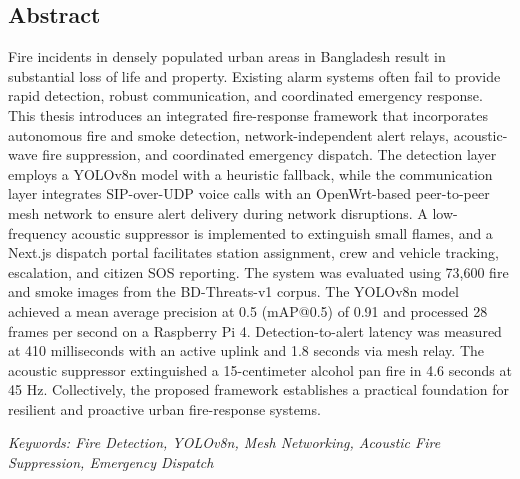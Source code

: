 \begin{center}
    \section*{Abstract}
\end{center}
Fire incidents in densely populated urban areas in Bangladesh result in substantial loss of life and property. Existing alarm systems often fail to provide rapid detection, robust communication, and coordinated emergency response. This thesis introduces an integrated fire-response framework that incorporates autonomous fire and smoke detection, network-independent alert relays, acoustic-wave fire suppression, and coordinated emergency dispatch. The detection layer employs a YOLOv8n model with a heuristic fallback, while the communication layer integrates SIP-over-UDP voice calls with an OpenWrt-based peer-to-peer mesh network to ensure alert delivery during network disruptions. A low-frequency acoustic suppressor is implemented to extinguish small flames, and a Next.js dispatch portal facilitates station assignment, crew and vehicle tracking, escalation, and citizen SOS reporting. The system was evaluated using 73,600 fire and smoke images from the BD-Threats-v1 corpus. The YOLOv8n model achieved a mean average precision at 0.5 (mAP@0.5) of 0.91 and processed 28 frames per second on a Raspberry Pi 4. Detection-to-alert latency was measured at 410 milliseconds with an active uplink and 1.8 seconds via mesh relay. The acoustic suppressor extinguished a 15-centimeter alcohol pan fire in 4.6 seconds at 45 Hz. Collectively, the proposed framework establishes a practical foundation for resilient and proactive urban fire-response systems.
\vspace{5mm}

\textit{Keywords: Fire Detection, YOLOv8n, Mesh Networking, Acoustic Fire Suppression, Emergency Dispatch}